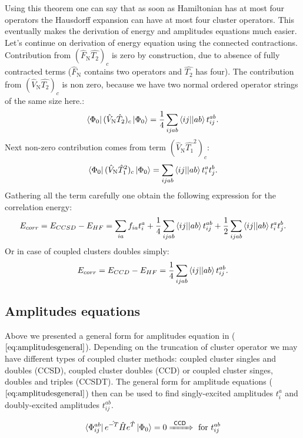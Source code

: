 \documentclass[twoside,english]{uiofysmaster}
\theoremstyle{definition}
\begin{document}
Using this theorem one can say that as soon as Hamiltonian has at most four operators the Hausdorff expansion can have at most four cluster operators. This eventually makes the derivation of energy and amplitudes equations much easier.\\
Let's continue on derivation of energy equation using the connected contractions. Contribution from $(\hat{F}_\text{N}\hat{T_2})_c$ is zero by construction, due to absence of fully contracted terms ($\hat{F}_\text{N}$ contains two operators and $\hat{T_2}$ has four). The contribution from $(\hat{V}_\text{N}\hat{T_2})_c$ is non zero, because we have two normal ordered operator strings of the same size here.:
\begin{equation}
\bra{\Phi_0}(\hat{V}_\text{N}\hat{T}_2)_c \ket{\Phi_0}=\frac{1}{4}\sum_{ijab} \braket{ij||ab}t_{ij}^{ab}.
\end{equation}
Next non-zero contribution comes from term $(\hat{V}_\text{N}\hat{T_1}^2)_c$:
\begin{equation}
\bra{\Phi_0}(\hat{V}_\text{N}\hat{T}_1^2)_c \ket{\Phi_0}=\sum_{ijab} \braket{ij||ab}t_{i}^{a}t_{j}^{b}.
\end{equation}
Gathering all the term carefully one obtain the following expression for the correlation energy:
\begin{equation}
E_{corr}= E_{CCSD} - E_{HF}= \sum_{ia} f_{ia}t_i^a + \frac{1}{4}\sum_{ijab} \braket{ij||ab}t_{ij}^{ab} +\frac{1}{2}\sum_{ijab} \braket{ij||ab}t_{i}^{a}t_{j}^{b}.
\end{equation}
Or in case of coupled clusters doubles simply:
\begin{equation}
E_{corr}= E_{CCD} - E_{HF}= \frac{1}{4}\sum_{ijab} \braket{ij||ab}t_{ij}^{ab}.
\end{equation}
\subsection{Amplitudes equations}
Above we presented a general form for amplitudes equation in ($\ref{eq:amplitudesgeneral}$). Depending on the truncation of cluster operator we may have different types of coupled cluster methods: coupled cluster singles and doubles (CCSD), coupled cluster doubles (CCD) or coupled cluster singes, doubles and triples (CCSDT). The general form for amplitude equations ($\ref{eq:amplitudesgeneral}$) then can be used to find singly-excited amplitudes $t_{i}^{a}$ and doubly-excited amplitudes  $t_{ij}^{ab}$. 


\begin{eqnarray}
\bra{\Phi_{ij}^{ab}}e^{\hat{-T}} \hat{H} e^{\hat{T}} \ket{\Phi_0}   = 0 \xRightarrow{~\textsf{CCD}~} \text{ for  $t_{ij}^{ab}$}
\end{eqnarray}
\end{document}
